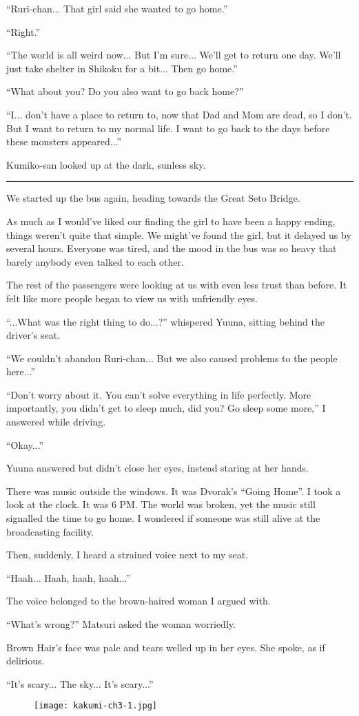 ``Ruri-chan... That girl said she wanted to go home.''

``Right.''

``The world is all weird now... But I'm sure... We'll get to return one day. We'll just take shelter in Shikoku for a bit... Then go home.''

``What about you? Do you also want to go back home?''

``I... don't have a place to return to, now that Dad and Mom are dead, so I don't. But I want to return to my normal life. I want to go back to the days before these monsters appeared...''

Kumiko-san looked up at the dark, sunless sky.

\vspace{\baselineskip}
\hrule
\vspace{\baselineskip}

We started up the bus again, heading towards the Great Seto Bridge.

As much as I would've liked our finding the girl to have been a happy ending, things weren't quite that simple. We might've found the girl, but it delayed us by several hours. Everyone was tired, and the mood in the bus was so heavy that barely anybody even talked to each other.

The rest of the passengers were looking at us with even less trust than before. It felt like more people began to view us with unfriendly eyes.

``...What was the right thing to do...?'' whispered Yuuna, sitting behind the driver's seat.

``We couldn't abandon Ruri-chan... But we also caused problems to the people here...''

``Don't worry about it. You can't solve everything in life perfectly. More importantly, you didn't get to sleep much, did you? Go sleep some more,'' I answered while driving.

``Okay...''

Yuuna answered but didn't close her eyes, instead staring at her hands.

There was music outside the windows. It was Dvorak's ``Going Home''. I took a look at the clock. It was 6 PM. The world was broken, yet the music still signalled the time to go home. I wondered if someone was still alive at the broadcasting facility.

Then, suddenly, I heard a strained voice next to my seat.

``Haah... Haah, haah, haah...''

The voice belonged to the brown-haired woman I argued with.

``What's wrong?'' Matsuri asked the woman worriedly.

Brown Hair's face was pale and tears welled up in her eyes. She spoke, as if delirious.

``It's scary... The sky... It's scary...''

\vspace{3\baselineskip}

\begin{figure}[h]
\centering
\texttt{[image: kakumi-ch3-1.jpg]}
\end{figure}

